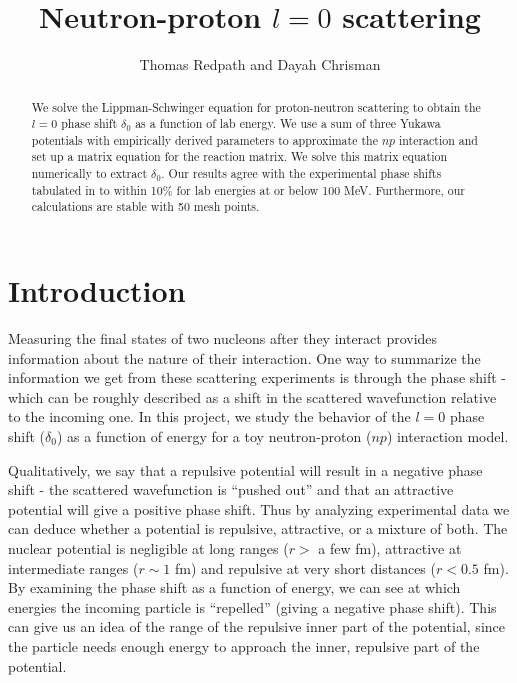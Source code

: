 \documentclass[10pt,showpacs,preprintnumbers,footinbib,amsmath,amssymb,aps,prl,twocolumn,groupedaddress,superscriptaddress,showkeys]{revtex4-1}
\begin{document}
\title{Neutron-proton $l=0$ scattering}
\author{Thomas Redpath and Dayah Chrisman}
\begin{abstract}

We solve the Lippman-Schwinger equation for proton-neutron scattering to obtain the $l=0$
phase shift $\delta _0$ as a function of lab energy. We use a sum of three Yukawa potentials
with empirically derived parameters to approximate the $np$ interaction and set up a matrix
equation for the reaction matrix. We solve this matrix equation numerically to extract
$\delta_0$. Our results agree with the experimental phase shifts tabulated in \citet{Nijmegen}
to within 10\% for lab energies at or below 100 MeV. Furthermore, our calculations are stable
with 50 mesh points.


\end{abstract}
\maketitle

\section{Introduction}

Measuring the final states of two nucleons after they interact provides information about
the nature of their interaction. One way to summarize the information we get from these
scattering experiments is through the phase shift - which can be roughly described as a
shift in the scattered wavefunction relative to the incoming one. In this project, we study
the behavior of the $l=0$ phase shift ($\delta _0$) as a function of energy for a toy
neutron-proton ($np$) interaction model.

Qualitatively, we say that a repulsive potential will result in a negative
phase shift - the scattered wavefunction is ``pushed out'' and that an attractive potential
will give a positive phase shift. Thus by analyzing experimental data we can deduce whether
a potential is repulsive, attractive, or a mixture of both. The nuclear potential is negligible at
long ranges ($r >$ a few fm), attractive at intermediate ranges ($r \sim 1$ fm) and repulsive
at very short distances ($r < 0.5$ fm). By examining the phase shift as a function of energy,
we can see at which energies the incoming particle is ``repelled'' (giving a negative phase
shift). This can give us an idea of the range of the repulsive inner part of the potential, since
the particle needs enough energy to approach the inner, repulsive part of the potential.
\end{document}
